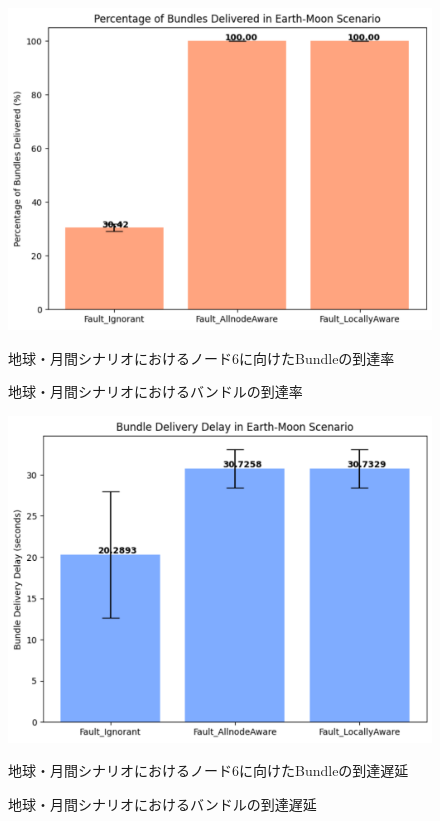 \begin{figure}[tbh]
    \centering
    \includegraphics[width=0.7\textheight]{results/moon/moon_bundle.pdf}
    \caption{地球・月間シナリオにおけるバンドルの到達率}
    \label{fig:graph_bundle_earth_moon}
    \begin{minipage}{\textwidth}
        \centering
        \vspace{3mm}
        地球・月間シナリオにおけるノード6に向けたBundleの到達率
    \end{minipage}
\end{figure}

\begin{figure}[tbh]
    \centering
    \includegraphics[width=0.7\textheight]{results/moon/moon_delay.pdf}
    \caption{地球・月間シナリオにおけるバンドルの到達遅延}
    \label{fig:graph_delay_earth_moon}
    \begin{minipage}{\textwidth}
        \centering
        \vspace{3mm}
        地球・月間シナリオにおけるノード6に向けたBundleの到達遅延
    \end{minipage}
\end{figure}


